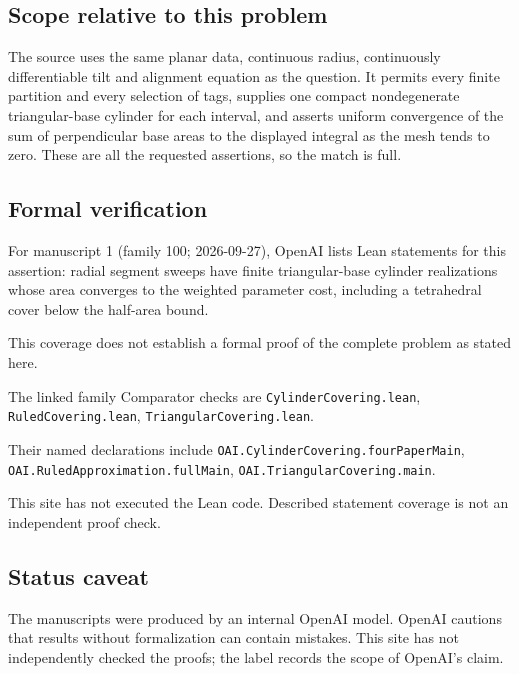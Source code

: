 \documentclass[11pt]{article}
\begin{document}
\subsection{Scope relative to this problem}
The source uses the same planar data, continuous radius, continuously differentiable tilt and alignment equation as the question. It permits every finite partition and every selection of tags, supplies one compact nondegenerate triangular-base cylinder for each interval, and asserts uniform convergence of the sum of perpendicular base areas to the displayed integral as the mesh tends to zero. These are all the requested assertions, so the match is full.

\subsection{Formal verification}
For manuscript 1 (family 100; 2026-09-27), OpenAI lists Lean statements for this assertion: radial segment sweeps have finite triangular-base cylinder realizations whose area converges to the weighted parameter cost, including a tetrahedral cover below the half-area bound.

This coverage does not establish a formal proof of the complete problem as stated here.

The linked family Comparator checks are \texttt{CylinderCovering.lean}, \texttt{RuledCovering.lean}, \texttt{TriangularCovering.lean}.

Their named declarations include \texttt{OAI.CylinderCovering.fourPaperMain}, \texttt{OAI.RuledApproximation.fullMain}, \texttt{OAI.TriangularCovering.main}.

This site has not executed the Lean code. Described statement coverage is not an independent proof check.

\subsection{Status caveat}
The manuscripts were produced by an internal OpenAI model. OpenAI cautions that results without formalization can contain mistakes. This site has not independently checked the proofs; the label records the scope of OpenAI's claim.
\end{document}

